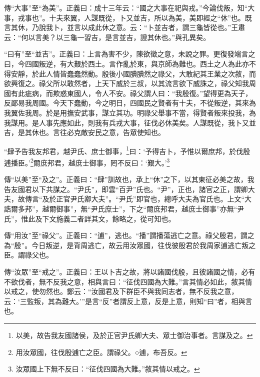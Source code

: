 {\noindent\zhuan{}\fzbyks 傳“大事”至“為美”。正義曰：成十三年云：“國之大事在祀與戎。”今論伐叛，知“大事，戎事也”。十夫來翼，人謀既從，卜又並吉，所以為美，美即經之“休”也。既言其休，乃說我卜，並言以成此休之意。云：“卜並吉者，謂三龜皆從也。”王肅云：“何以言美？以三龜一習吉，是言並吉，證其休也。”與孔異矣。 \par}

{\noindent\shu{}\fzkt “曰有”至“並吉”。正義曰：上言為害不少，陳欲徵之意，未說之罪。更復發端言之曰，今四國叛逆，有大艱於西土。言作亂於東，與京師為難也。西土之人為此亦不得安靜，於此人情皆蠢蠢然動。殷後小國腆腆然之祿父，大敢紀其王業之次敘，而欲興復之。祿父所以敢然者，上天下威於三叔，以其流言欲下威誅之，祿父知我周國有此疵病，而欺惑東國人，令人不安。祿父謂人曰：“我殷復。”望得更為天子，反鄙易我周國。今天下蠢動，今之明日，四國民之賢者有十夫，不從叛逆，其來為我翼佐我周。於是用撫安武事，謀立其功。明祿父舉事不當，得賢者叛來投我，為我謀用。是人事先應如此，則我有兵戎大事，征伐必休美矣。人謀既從，我卜又並吉，是其休也。言往必克敵安民之意，告眾使知也。 \par}

“肆予告我友邦君，越尹氏、庶士御事，\footnote{以美，故告我友國諸侯，及於正官尹氏卿大夫、眾士御治事者。言謀及之。}曰：‘予得吉卜，予惟以爾庶邦，於伐殷逋播臣。’\footnote{用汝眾國，往伐殷逋亡之臣。謂祿父。○逋，布吾反。}爾庶邦君，越庶士御事，罔不反曰：‘艱大。’\footnote{汝眾國上下無不反曰：“征伐四國為大難。”敘其情以戒之。}


{\noindent\zhuan{}\fzbyks 傳“以美”至“及之”。正義曰：“肆”訓故也，承上“休”之下，以其東征必美之故，我告友國君以下共謀之。“尹氏”，即雲“百尹”氏也。“尹”，正也，諸官之正，謂卿大夫，故傳言“及於正官尹氏卿大夫”。“尹氏”即官也，總呼大夫為官氏也。上文“大誥爾多邦”，越爾御事”，無“尹氏庶士”，下之“爾庶邦君，越庶士御事”亦無“尹氏”，惟此及下文施義二者詳其文，餘略之，從可知也。 \par}

{\noindent\zhuan{}\fzbyks 傳“用汝”至“祿父”。正義曰：“逋”，逃也。“播”謂播蕩逃亡之意。祿父殷君，謂之為“殷”。今日叛逆，是背周逃亡，故云用汝眾國，往伐彼殷君於我周家逋逃亡叛之臣。謂祿父也。 \par}

{\noindent\zhuan{}\fzbyks 傳“汝眾”至“戒之”。正義曰：王以卜吉之故，將以諸國伐殷，且彼諸國之情，必有不欲伐者，無不反我之意，相與言曰：“征伐四國為大難。”言其情必如此，敘其情以戒之，使勿然也。鄭云：“汝國君及下群臣不與我同志者，無不反我之意，云：‘三監叛，其為難大。’”是言“反”者謂反上意，反是上意，則知“曰”者，相與言也。 \par}

